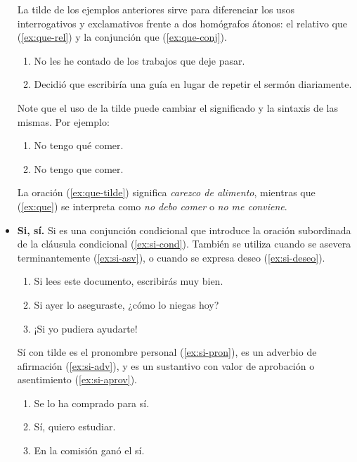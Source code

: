 \documentclass[twocolumn,11pts]{IEEEtran}
\begin{document}
\begin{itemize}
La tilde de los ejemplos anteriores sirve para diferenciar los usos interrogativos y exclamativos frente a dos homógrafos átonos: el relativo que (\ref{ex:que-rel}) y la conjunción que (\ref{ex:que-conj}).
\begin{enumerate}[\itshape]
\item\label{ex:que-rel} No les he contado de los trabajos que deje pasar.
\item\label{ex:que-conj} Decidió que escribiría una guía en lugar de repetir el sermón diariamente.
\end{enumerate}

Note que el uso de la tilde puede cambiar el significado y la sintaxis de las mismas. Por ejemplo:
\begin{enumerate}[\itshape]
\item\label{ex:que-tilde} No tengo qué comer.
\item\label{ex:que} No tengo que comer.
\end{enumerate}
La oración (\ref{ex:que-tilde}) significa \emph{carezco de alimento}, mientras que (\ref{ex:que}) se interpreta como \emph{no debo comer} o \emph{no me conviene}.

\item \textbf{Si, sí.} Si es una conjunción condicional que introduce la oración subordinada de la cláusula condicional (\ref{ex:si-cond}). También se utiliza cuando se asevera terminantemente (\ref{ex:si-asv}), o cuando se expresa deseo (\ref{ex:si-deseo}).
\begin{enumerate}[\itshape]
\item\label{ex:si-cond} Si lees este documento, escribirás muy bien.
\item\label{ex:si-asv} Si ayer lo aseguraste, ¿cómo lo niegas hoy?
\item\label{ex:si-deseo} ¡Si yo pudiera ayudarte!
\end{enumerate}

Sí con tilde es el pronombre personal (\ref{ex:si-pron}), es un adverbio de afirmación (\ref{ex:si-adv}), y es un sustantivo con valor de aprobación o asentimiento (\ref{ex:si-aprov}).
\begin{enumerate}[\itshape]
\item\label{ex:si-pron} Se lo ha comprado para sí.
\item\label{ex:si-adv} Sí, quiero estudiar.
\item\label{ex:si-aprov} En la comisión ganó el sí.
\end{enumerate}

\end{itemize}%
\end{document}
